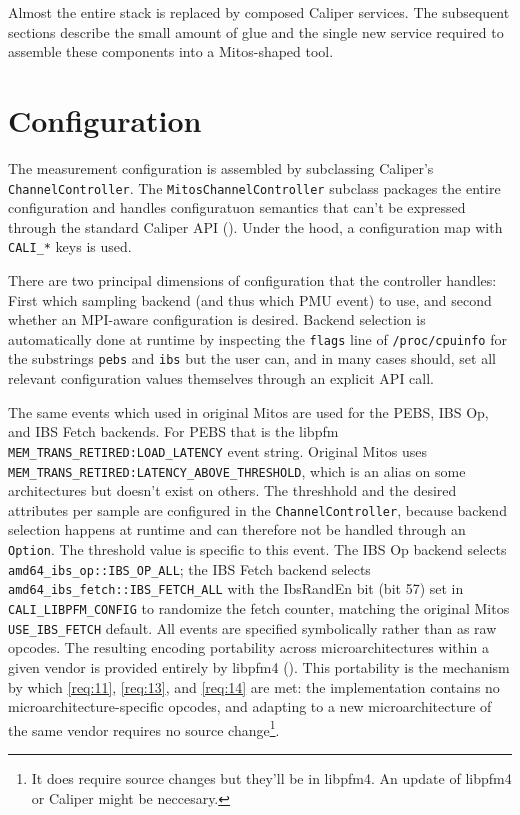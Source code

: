 Almost the entire stack is replaced by composed Caliper services. The subsequent sections describe the small amount of glue and the single new service required to assemble these components into a Mitos-shaped tool.

\section{Configuration}\label{sec:calimitos-config}

The measurement configuration is assembled by subclassing Caliper's \texttt{ChannelController}. The \texttt{MitosChannelController} subclass packages the entire configuration and handles configuratuon semantics that can't be expressed through the standard Caliper API (). Under the hood, a configuration map with \texttt{CALI\_*} keys is used.

There are two principal dimensions of configuration that the controller handles:
First which sampling backend (and thus which PMU event) to use, and second whether an MPI-aware configuration is desired. Backend selection is automatically done at runtime by inspecting the \texttt{flags} line of \texttt{/proc/cpuinfo} for the substrings \texttt{pebs} and \texttt{ibs} but the user can, and in many cases should, set all relevant configuration values themselves through an explicit API call.

The same events which used in original Mitos are used for the PEBS, IBS Op, and IBS Fetch backends.
For PEBS that is the libpfm \texttt{MEM\_TRANS\_RETIRED:LOAD\_LATENCY} event string. Original Mitos uses \texttt{MEM\_TRANS\_RETIRED:LATENCY\_ABOVE\_THRESHOLD}, which is an alias on some architectures but doesn't exist on others\cite{libpfm4}. The threshhold and the desired attributes per sample are configured in the \texttt{ChannelController}, because backend selection happens at runtime and can therefore not be handled through an \texttt{Option}. The threshold value is specific to this event.
The IBS Op backend selects \texttt{amd64\_ibs\_op::IBS\_OP\_ALL}; the IBS Fetch backend selects \texttt{amd64\_ibs\_fetch::IBS\_FETCH\_ALL} with the IbsRandEn bit (bit 57) set in \texttt{CALI\_LIBPFM\_CONFIG} to randomize the fetch counter, matching the original Mitos \texttt{USE\_IBS\_FETCH} default\cite[13.3.2]{AMDManual}. All events are specified symbolically rather than as raw opcodes. The resulting encoding portability across microarchitectures within a given vendor is provided entirely by libpfm4 (). This portability is the mechanism by which \ref{req:11}, \ref{req:13}, and \ref{req:14} are met: the implementation contains no microarchitecture-specific opcodes, and adapting to a new microarchitecture of the same vendor requires no source change\footnote{It does require source changes but they'll be in libpfm4. An update of libpfm4 or Caliper might be neccesary.}.

